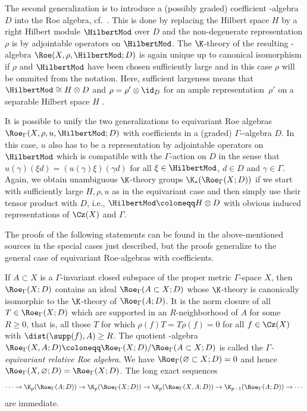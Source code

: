 The second generalization is to introduce a (possibly graded) coefficient \textCstar-algebra $D$ into the Roe algebra, cf.\ \cite{HankePapeSchick,HigsonPedersenRoe,WulffTwisted}. This is done by replacing the Hilbert space $H$ by a right Hilbert module $\HilbertMod$ over $D$ and the non-degenerate representation $\rho$ is by adjointable operators on $\HilbertMod$.
The $\K$-theory of the resulting \textCstar-algebra $\Roe(X,\rho,\HilbertMod;D)$ is again unique up to canonical isomorphism if $\rho$ and $\HilbertMod$ have been chosen sufficiently large and in this case $\rho$ will be ommited from the notation. Here, sufficient largeness means that $\HilbertMod\cong H\otimes D$ and $\rho=\rho'\otimes \id_D$ for an ample representation~$\rho'$ on a separable Hilbert space $H$ \cite[Definition 4.5]{HigsonPedersenRoe}.


It is possible to unify the two generalizations to equivariant Roe algebras $\Roe_\Gamma(X,\rho,u,\HilbertMod;D)$ with coefficients in a (graded) $\Gamma$-\textCstar-algebra $D$.
In this case, $u$ also has to be a representation by adjointable operators on $\HilbertMod$ which is compatible with the $\Gamma$-action on $D$ in the sense that $u(\gamma)(\xi d)=(u(\gamma)\xi) (\gamma d)$ for all $\xi\in\HilbertMod$, $d\in D$ and $\gamma\in\Gamma$.
Again, we obtain unambiguous $\K$-theory groups $\K_*(\Roe_\Gamma(X;D))$ if we start with sufficiently large $H,\rho,u$ as in the equivariant case and then simply use their tensor product with $D$, i.e., $\HilbertMod\coloneqq H\otimes D$ with obvious induced representations of $\Cz(X)$ and $\Gamma$.




The proofs of the following statements can be found in the above-mentioned sources in the special cases just described, but the proofs generalize to the general case of equivariant Roe-algebras with coefficients.

If $A\subset X$ is a $\Gamma$-invariant closed subspace of the proper metric $\Gamma$-space $X$, then $\Roe_\Gamma(X;D)$ contains an ideal $\Roe_\Gamma(A\subset X;D)$ whose $\K$-theory is canonically isomorphic to the $\K$-theory of $\Roe_\Gamma(A;D)$.
It is the norm closure of all $T\in\Roe_\Gamma(X;D)$ which are supported in an $R$-neighborhood of $A$ for some $R\geq 0$, that is, all those $T$ for which $\rho(f)T=T\rho(f)=0$ for all $f\in\Cz(X)$ with $\dist(\supp(f),A)\geq R$.
The quotient \textCstar-algebra $\Roe_\Gamma(X,A;D)\coloneqq \Roe_\Gamma(X;D)/\Roe_\Gamma(A\subset X;D)$ is called the \emph{$\Gamma$-equivariant relative Roe algebra}. We have $\Roe_\Gamma(\varnothing\subset X;D)=0$ and hence $\Roe_\Gamma(X,\varnothing;D)=\Roe_\Gamma(X;D)$. The long exact sequences
\[
\dots\to\K_p(\Roe_\Gamma(A;D))\to \K_p(\Roe_\Gamma(X;D))\to \K_p(\Roe_\Gamma(X,A;D))\to \K_{p-1}(\Roe_\Gamma(A;D))\to \cdots
\]
are immediate.
